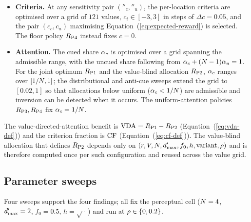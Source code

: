 \begin{itemize}
\item \textbf{Criteria.} At any sensitivity pair $(\dprime_c,
  \dprime_u)$, the per-location criteria are optimised over a grid of
  $121$ values, $c_i \in [-3, 3]$ in steps of $\Delta c = 0.05$, and the
  pair $(c_c, c_u)$ maximising Equation~(\ref{eq:expected-reward}) is
  selected. The floor policy $R_{\mathrm{P4}}$ instead fixes $c = 0$.
\item \textbf{Attention.} The cued share $\alpha_c$ is optimised over
  a grid spanning the admissible range, with the uncued share following
  from $\alpha_c + (N - 1)\alpha_u = 1$. For the joint optimum
  $R_{\mathrm{P1}}$ and the value-blind allocation $R_{\mathrm{P2}}$, $\alpha_c$ ranges
  over $[1/N, 1]$; the distributional and anti-cue sweeps extend the
  grid to $[0.02, 1]$ so that allocations below uniform
  ($\alpha_c < 1/N$) are admissible and inversion can be detected
  when it occurs. The uniform-attention policies $R_{\mathrm{P3}}, R_{\mathrm{P4}}$ fix
  $\alpha_c = 1/N$.
\end{itemize}

The value-directed-attention benefit is $\mathrm{VDA} = R_{\mathrm{P1}} - R_{\mathrm{P2}}$
(Equation~(\ref{eq:vda-def})) and the criterion fraction is $\mathrm{CF}$
(Equation~(\ref{eq:cf-def})). The value-blind allocation that defines
$R_{\mathrm{P2}}$ depends only on $(r, V, N, d'_{\max}, f_0, h,
\text{variant}, \rho)$ and is therefore computed once per such
configuration and reused across the value grid.

\subsection{Parameter sweeps}
\label{sec:methods-sweeps}

Four sweeps support the four findings; all fix the perceptual cell
($N = 4$, $d'_{\max} = 2$, $f_0 = 0.5$, $h = \sqrt{\,\cdot\,}$) and
run at $\rho \in \{0, 0.2\}$.

